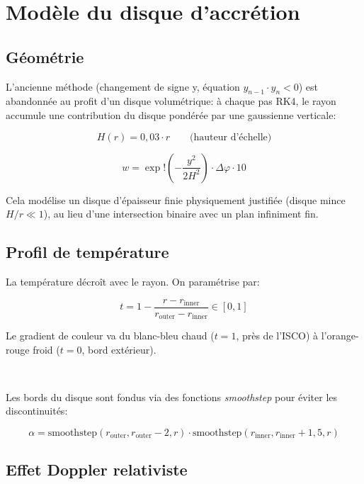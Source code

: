 \documentclass[12pt, a4paper]{article}
\begin{document}
\section{Modèle du disque d'accrétion}

\subsection{Géométrie}

L'ancienne méthode (changement de signe y, équation $y_{n-1} \cdot y_n < 0$) est abandonnée au profit
d'un disque volumétrique: à chaque pas RK4, le rayon accumule une contribution du disque pondérée par
une gaussienne verticale:

\begin{equation}
    H(r) = 0{,}03 \cdot r \qquad \text{(hauteur d'échelle)}
\end{equation}

\begin{equation}
    w = \exp!\left(-\frac{y^2}{2H^2}\right) \cdot \Delta\varphi \cdot 10
\end{equation}

Cela modélise un disque d'épaisseur finie physiquement justifiée (disque mince $H/r \ll 1$), au lieu d'une intersection binaire avec un plan infiniment fin.

\subsection{Profil de température}

La température décroît avec le rayon. On paramétrise par:

\begin{equation}
    t = 1 - \frac{r - r_{\text{inner}}}{r_{\text{outer}} - r_{\text{inner}}} \in [0, 1]
\end{equation}

Le gradient de couleur va du blanc-bleu chaud ($t = 1$, près de l'ISCO)
à l'orange-rouge froid ($t = 0$, bord extérieur).

\

Les bords du disque sont fondus via des fonctions \textit{smoothstep} pour éviter les discontinuités:

\begin{equation}
    \alpha = \text{smoothstep}(r_{\text{outer}}, r_{\text{outer}}-2, r) \cdot \text{smoothstep}(r_{\text{inner}}, r_{\text{inner}}+1{,}5, r)
\end{equation}

\subsection{Effet Doppler relativiste}
\end{document}
